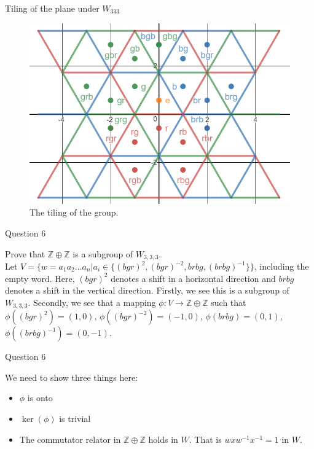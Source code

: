 \documentclass[usenames,dvipsnames]{beamer}
\newcommand{\Z}{\mathbb{Z}}
\begin{document}
\begin{frame}{Tiling of the plane under $W_{333}$}

\begin{figure}[h]
    \centering
    \includegraphics[width=.7\textwidth]{images/6-05-rbg_rbg_3-tiling.png}
    \caption{The tiling of the group.}
\end{figure}

\end{frame}

\begin{frame}{Question 6}

Prove that $\Z \oplus \Z$ is a subgroup of $W_{3,3,3}$.\\

Let $V=\{w={a_1a_2\ldots a_n} | a_i\in\{(bgr)^2,(bgr)^{-2},brbg,(brbg)^{-1}\}\}$, including the empty
word. Here, $(bgr)^2$ denotes a shift in a horizontal direction and $brbg$ denotes a shift in the vertical
direction. Firstly, we see this is a subgroup of $W_{3,3,3}$. Secondly, we see that a mapping
$\phi:V\rightarrow \Z \oplus \Z$ such that $\phi((bgr)^2)=(1,0)$, $\phi((bgr)^{-2})=(-1,0)$,
$\phi(brbg)=(0,1)$, $\phi((brbg)^{-1})=(0,-1)$. 


\end{frame}

\begin{frame}{Question 6}

We need to show three things here:

\begin{itemize}
\item $\phi$ is onto
\item $\ker(\phi)$ is trivial
\item The commutator relator in $\Z \oplus \Z$ holds in $W$. That is $wxw^{-1}x^{-1}=1$  in $W$.
\end{itemize}

\end{frame}
\end{document}
